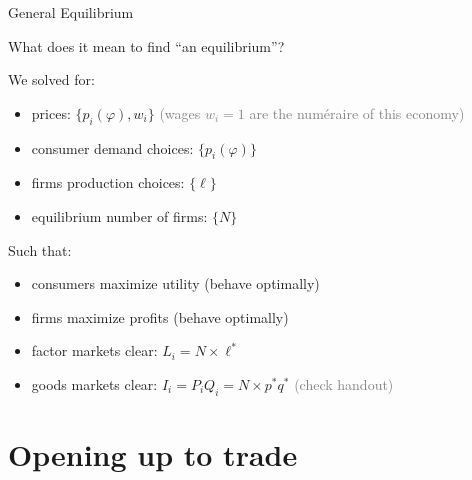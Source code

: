 \documentclass[notes,11pt, aspectratio=169, xcolor=table]{beamer}
\newenvironment{wideitemize}{\itemize\addtolength{\itemsep}{10pt}}{\enditemize}
\begin{document}
\begin{frame}{General Equilibrium}
\begin{wideitemize}
    \item What does it mean to find ``an equilibrium''?

    \item<2-> We solved for:
    \begin{itemize}
        \item prices: $\{p_i(\varphi),w_i\}$ \textcolor{gray}{{\scriptsize (wages $w_i=1$ are the num\'eraire of this economy)}}
        \item consumer demand choices: $\{p_i(\varphi)\}$
        \item firms production choices: $\{\ell\}$
        \item equilibrium number of firms: $\{N\}$
    \end{itemize}

    \item<3-> Such that:
    \begin{itemize}
        \item consumers maximize utility (behave optimally)
        \item firms maximize profits (behave optimally)
        \item factor markets clear: $L_i = N \times \ell^*$ 
        \item goods markets clear: $I_i = P_iQ_i = N\times p^* q^*$ \textcolor{gray}{{\scriptsize (check handout)}}
    \end{itemize}    
    
\end{wideitemize}
\end{frame}

\section{Opening up to trade}
\end{document}
